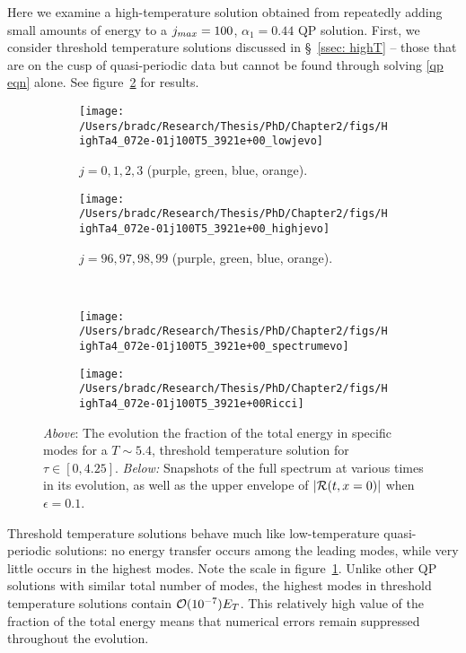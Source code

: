 \documentclass[../PhD.tex]{subfiles}
\begin{document}
Here we examine a high-temperature solution obtained from repeatedly adding small amounts of energy to a $j_{max} = 100$, $\alpha_1 = 0.44$ QP solution. First, we consider threshold temperature solutions discussed in \S~\!\ref{ssec: highT} -- those that are on the cusp of quasi-periodic data but cannot be found through solving \eqref{qp eqn} alone. See figure~\ref{fig:HighTa4_072e-01j100T5_3921e+00_evo} for results.

\begin{figure}[h]
	\centering
	\begin{subfigure}[t]{0.48\textwidth}
		\texttt{[image: /Users/bradc/Research/Thesis/PhD/Chapter2/figs/HighTa4\_072e-01j100T5\_3921e+00\_lowjevo]}
		\caption{$j = 0, 1, 2, 3$ (purple, green, blue, orange).}
	\end{subfigure}
	\;
	\begin{subfigure}[t]{0.48\textwidth}
		\texttt{[image: /Users/bradc/Research/Thesis/PhD/Chapter2/figs/HighTa4\_072e-01j100T5\_3921e+00\_highjevo]}
		\caption{$j=96, 97, 98, 99$ (purple, green, blue, orange).}
		\label{fig: HighTa4_072e-01j100T5_3921e+00_highjevo}
	\end{subfigure}
	\\
	\begin{subfigure}[t]{0.48\textwidth}
		\texttt{[image: /Users/bradc/Research/Thesis/PhD/Chapter2/figs/HighTa4\_072e-01j100T5\_3921e+00\_spectrumevo]}
	\end{subfigure}
	\quad
	\begin{subfigure}[t]{0.48\textwidth}
		\texttt{[image: /Users/bradc/Research/Thesis/PhD/Chapter2/figs/HighTa4\_072e-01j100T5\_3921e+00Ricci]}
	\end{subfigure}
	\caption{{\it Above}: The evolution the fraction of the total energy in specific modes for a $T \sim 5.4$, threshold temperature solution for $\tau \in [0, 4.25]$. {\it Below:} Snapshots of the full spectrum at various times in its evolution, as well as the upper envelope of $| \mathcal R(t,x=0)|$ when $\epsilon = 0.1$.}
	\label{fig:HighTa4_072e-01j100T5_3921e+00_evo}
\end{figure}

Threshold temperature solutions behave much like low-temperature quasi-periodic solutions: no energy transfer occurs among the leading modes, while very little occurs in the highest modes. Note the scale in figure~\ref{fig: HighTa4_072e-01j100T5_3921e+00_highjevo}. Unlike other QP solutions with similar total number of modes, the highest modes in threshold temperature solutions contain $\mathcal O(10^{-7}) E_T $. This relatively high value of the fraction of the total energy means that numerical errors remain suppressed throughout the evolution.
\end{document}
